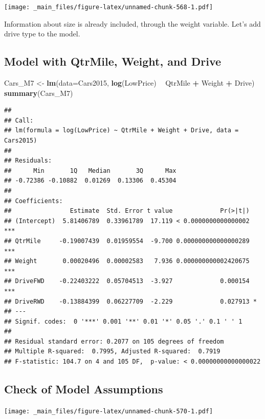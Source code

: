 \documentclass[]{book}
\newenvironment{Shaded}{\begin{snugshade}}{\end{snugshade}}
\newcommand{\KeywordTok}[1]{\textcolor[rgb]{0.13,0.29,0.53}{\textbf{#1}}}
\newcommand{\DataTypeTok}[1]{\textcolor[rgb]{0.13,0.29,0.53}{#1}}
\newcommand{\StringTok}[1]{\textcolor[rgb]{0.31,0.60,0.02}{#1}}
\newcommand{\OperatorTok}[1]{\textcolor[rgb]{0.81,0.36,0.00}{\textbf{#1}}}
\newcommand{\NormalTok}[1]{#1}
\begin{document}
\texttt{[image: \_main\_files/figure-latex/unnamed-chunk-568-1.pdf]}

Information about size is already included, through the weight variable.
Let's add drive type to the model.

\subsection{Model with QtrMile, Weight, and
Drive}\label{model-with-qtrmile-weight-and-drive}

\begin{Shaded}
\begin{Highlighting}[]
\NormalTok{Cars_M7 <-}\StringTok{ }\KeywordTok{lm}\NormalTok{(}\DataTypeTok{data=}\NormalTok{Cars2015, }\KeywordTok{log}\NormalTok{(LowPrice) }\OperatorTok{~}\StringTok{ }\NormalTok{QtrMile }\OperatorTok{+}\StringTok{ }\NormalTok{Weight }\OperatorTok{+}\StringTok{ }\NormalTok{Drive)}
\KeywordTok{summary}\NormalTok{(Cars_M7)}
\end{Highlighting}
\end{Shaded}

\begin{verbatim}
## 
## Call:
## lm(formula = log(LowPrice) ~ QtrMile + Weight + Drive, data = Cars2015)
## 
## Residuals:
##      Min       1Q   Median       3Q      Max 
## -0.72386 -0.10882  0.01269  0.13306  0.45304 
## 
## Coefficients:
##                Estimate  Std. Error t value             Pr(>|t|)    
## (Intercept)  5.81406789  0.33961789  17.119 < 0.0000000000000002 ***
## QtrMile     -0.19007439  0.01959554  -9.700 0.000000000000000289 ***
## Weight       0.00020496  0.00002583   7.936 0.000000000002420675 ***
## DriveFWD    -0.22403222  0.05704513  -3.927             0.000154 ***
## DriveRWD    -0.13884399  0.06227709  -2.229             0.027913 *  
## ---
## Signif. codes:  0 '***' 0.001 '**' 0.01 '*' 0.05 '.' 0.1 ' ' 1
## 
## Residual standard error: 0.2077 on 105 degrees of freedom
## Multiple R-squared:  0.7995, Adjusted R-squared:  0.7919 
## F-statistic: 104.7 on 4 and 105 DF,  p-value: < 0.00000000000000022
\end{verbatim}

\subsection{Check of Model
Assumptions}\label{check-of-model-assumptions}

\texttt{[image: \_main\_files/figure-latex/unnamed-chunk-570-1.pdf]}
\end{document}
